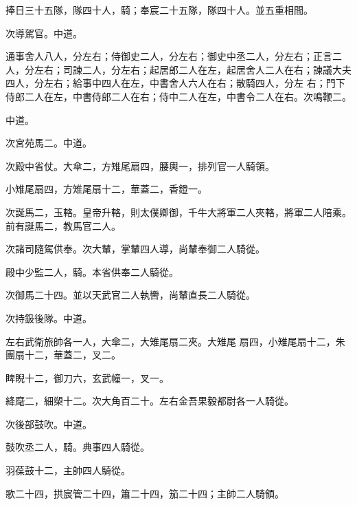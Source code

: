\begin{pinyinscope}
 捧日三十五隊，隊四十人，騎；奉宸二十五隊，隊四十人。並五重相間。



 次導駕官。中道。



 通事舍人八人，分左右；侍御史二人，分左右；御史中丞二人，分左右；正言二人，分左右；司諫二人，分左右；起居郎二人在左，起居舍人二人在右；諫議大夫四人，分左右；給事中四人在左，中書舍人六人在右；散騎四人，分左
 右；門下侍郎二人在左，中書侍郎二人在右；侍中二人在左，中書令二人在右。次鳴鞭二。



 中道。



 次宮苑馬二。中道。



 次殿中省仗。大傘二，方雉尾扇四，腰輿一，排列官一人騎領。



 小雉尾扇四，方雉尾扇十二，華蓋二，香鐙一。



 次誕馬二，玉輅。皇帝升輅，則太僕卿御，千牛大將軍二人夾輅，將軍二人陪乘。前有誕馬二，教馬官二人。



 次諸司隨駕供奉。次大輦，掌輦四人導，尚輦奉御二人騎從。



 殿中少監二人，騎。本省供奉二人騎從。



 次御馬二十四。並以天武官二人執轡，尚輦直長二人騎從。



 次持鈒後隊。中道。



 左右武衛旅帥各一人，大傘二，大雉尾扇二夾。大雉尾
 扇四，小雉尾扇十二，朱團扇十二，華蓋二，叉二。



 睥睨十二，御刀六，玄武幢一，叉一。



 絳麾二，細槊十二。次大角百二十。左右金吾果毅都尉各一人騎從。



 次後部鼓吹。中道。



 鼓吹丞二人，騎。典事四人騎從。



 羽葆鼓十二，主帥四人騎從。



 歌二十四，拱宸管二十四，簫二十四，笳二十四；主帥二人騎領。




\end{pinyinscope}
